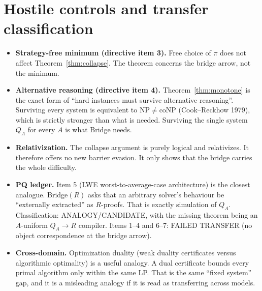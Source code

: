 \documentclass[11pt]{article}
\theoremstyle{definition}
\begin{document}
\section{Hostile controls and transfer classification}
\begin{itemize}
\item \textbf{Strategy-free minimum (directive item 3).} Free choice of $\pi$ does not affect Theorem~\ref{thm:collapse}. The theorem concerns the bridge arrow, not the minimum.
\item \textbf{Alternative reasoning (directive item 4).} Theorem~\ref{thm:monotone} is the exact form of ``hard instances must survive alternative reasoning''. Surviving every system is equivalent to $\mathrm{NP}\neq\mathrm{coNP}$ (Cook--Reckhow 1979), which is strictly stronger than what is needed. Surviving the single system $Q_A$ for every $A$ is what Bridge needs.
\item \textbf{Relativization.} The collapse argument is purely logical and relativizes. It therefore offers no new barrier evasion. It only shows that the bridge carries the whole difficulty.
\item \textbf{PQ ledger.} Item 5 (LWE worst-to-average-case architecture) is the closest analogue. Bridge$(R)$ asks that an arbitrary solver's behaviour be ``externally extracted'' as $R$-proofs. That is exactly simulation of $Q_A$. Classification: ANALOGY/CANDIDATE, with the missing theorem being an $A$-uniform $Q_A\to R$ compiler. Items 1--4 and 6--7: FAILED TRANSFER (no object correspondence at the bridge arrow).
\item \textbf{Cross-domain.} Optimization duality (weak duality certificates versus algorithmic optimality) is a useful analogy. A dual certificate bounds every primal algorithm only within the same LP. That is the same ``fixed system'' gap, and it is a misleading analogy if it is read as transferring across models.
\end{itemize}
\end{document}
